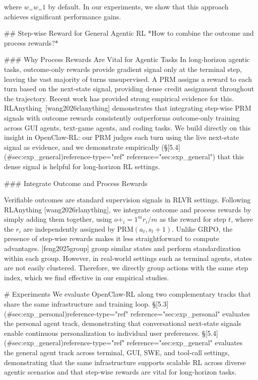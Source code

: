 where $w_ = w_ = 1$ by default. In our experiments, we show that this approach achieves significant performance gains.

## Step-wise Reward for General Agentic RL
*How to combine the outcome and process rewards?*

### Why Process Rewards Are Vital for Agentic Tasks
In long-horizon agentic tasks, outcome-only rewards provide gradient signal only at the terminal step, leaving the vast majority of turns unsupervised. A PRM assigns a reward to each turn based on the next-state signal, providing dense credit assignment throughout the trajectory. Recent work has provided strong empirical evidence for this. RLAnything [wang2026rlanything] demonstrates that integrating step-wise PRM signals with outcome rewards consistently outperforms outcome-only training across GUI agents, text-game agents, and coding tasks. We build directly on this insight in OpenClaw-RL: our PRM judges each turn using the live next-state signal as evidence, and we demonstrate empirically (§[5.4](#sec:exp_general)reference-type="ref" reference="sec:exp_general") that this dense signal is helpful for long-horizon RL settings.

### Integrate Outcome and Process Rewards

Verifiable outcomes are standard supervision signals in RLVR settings. Following RLAnything [wang2026rlanything], we integrate outcome and process rewards by simply adding them together, using $o + _i=1^m r_i / m$ as the reward for step $t$, where the $r_i$ are independently assigned by PRM$(a_t, s_t+1)$. Unlike GRPO, the presence of step-wise rewards makes it less straightforward to compute advantages. [feng2025group] group similar states and perform standardization within each group. However, in real-world settings such as terminal agents, states are not easily clustered. Therefore, we directly group actions with the same step index, which we find effective in our empirical studies.

# Experiments
We evaluate OpenClaw-RL along two complementary tracks that share the same infrastructure and training loop. §[5.3](#sec:exp_personal)reference-type="ref" reference="sec:exp_personal" evaluates the personal agent track, demonstrating that conversational next-state signals enable continuous personalization to individual user preferences. §[5.4](#sec:exp_general)reference-type="ref" reference="sec:exp_general" evaluates the general agent track across terminal, GUI, SWE, and tool-call settings, demonstrating that the same infrastructure supports scalable RL across diverse agentic scenarios and that step-wise rewards are vital for long-horizon tasks.

